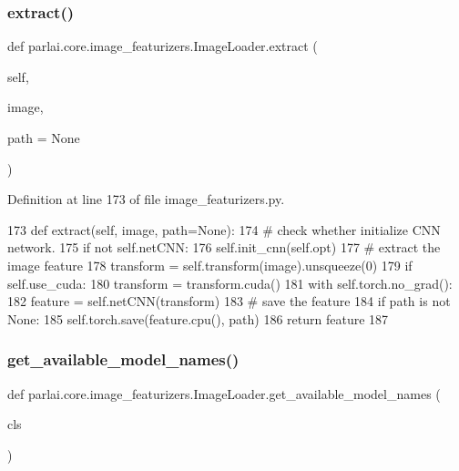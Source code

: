 \subsubsection{\texorpdfstring{extract()}{extract()}}
{\footnotesize\ttfamily def parlai.\+core.\+image\+\_\+featurizers.\+Image\+Loader.\+extract (\begin{DoxyParamCaption}\item[{}]{self,  }\item[{}]{image,  }\item[{}]{path = {\ttfamily None} }\end{DoxyParamCaption})}



Definition at line 173 of file image\+\_\+featurizers.\+py.


\begin{DoxyCode}
173     \textcolor{keyword}{def }extract(self, image, path=None):
174         \textcolor{comment}{# check whether initialize CNN network.}
175         \textcolor{keywordflow}{if} \textcolor{keywordflow}{not} self.netCNN:
176             self.init\_cnn(self.opt)
177         \textcolor{comment}{# extract the image feature}
178         transform = self.transform(image).unsqueeze(0)
179         \textcolor{keywordflow}{if} self.use\_cuda:
180             transform = transform.cuda()
181         with self.torch.no\_grad():
182             feature = self.netCNN(transform)
183         \textcolor{comment}{# save the feature}
184         \textcolor{keywordflow}{if} path \textcolor{keywordflow}{is} \textcolor{keywordflow}{not} \textcolor{keywordtype}{None}:
185             self.torch.save(feature.cpu(), path)
186         \textcolor{keywordflow}{return} feature
187 
\end{DoxyCode}
\mbox{\label{classparlai_1_1core_1_1image__featurizers_1_1ImageLoader_ae28b5b3cf297bacc15fa563bb3a83dfa}} 
\subsubsection{\texorpdfstring{get\+\_\+available\+\_\+model\+\_\+names()}{get\_available\_model\_names()}}
{\footnotesize\ttfamily def parlai.\+core.\+image\+\_\+featurizers.\+Image\+Loader.\+get\+\_\+available\+\_\+model\+\_\+names (\begin{DoxyParamCaption}\item[{}]{cls }\end{DoxyParamCaption})}

